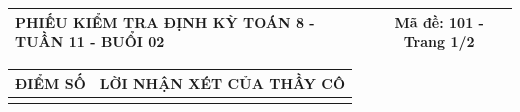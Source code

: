 \documentclass[12pt,a4paper]{article}
\begin{document}
\pagestyle{empty}
\noindent
\begin{tabularx}{\linewidth}{|X|c|}
\hline
\textbf{PHIẾU KIỂM TRA ĐỊNH KỲ TOÁN 8 - TUẦN 11 - BUỔI 02} & \textbf{Mã đề: 101 - Trang 1/2} \\
\hline
\end{tabularx}

\vspace{1.0mm}

\noindent
\begin{tabularx}{\linewidth}{|p{3.2cm}|X|}
\hline
\centering\textbf{ĐIỂM SỐ} & \centering\textbf{LỜI NHẬN XÉT CỦA THẦY CÔ} \tabularnewline
\hline
\rule{0pt}{1.8cm} & \tabularnewline
\hline
\end{tabularx}
\end{document}
